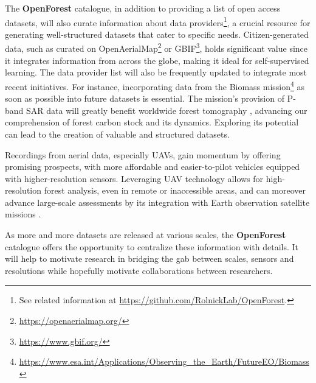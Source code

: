 \documentclass{CUP-JNL-DTM}%
\newcommand{\ELc}[1]{\textcolor{orange}{[\textbf{Eti}: #1]}}
\newcommand{\TKc}[1]{\textcolor{olive}{[\textbf{Tej}: #1]}}
\theoremstyle{definition}
\numberwithin{equation}{section}
\begin{document}
The \textbf{OpenForest} catalogue, in addition to providing a list of open access datasets, will also curate information about data providers\footnote{See related information at \url{https://github.com/RolnickLab/OpenForest}.}, a crucial resource for generating well-structured datasets that cater to specific needs. Citizen-generated data, such as curated on OpenAerialMap\footnote{\url{https://openaerialmap.org/}} or GBIF\footnote{\url{https://www.gbif.org/}}, holds significant value since it integrates information from across the globe, making it ideal for self-supervised learning. The data provider list will also be frequently updated to integrate most recent initiatives. For instance, incorporating data from the Biomass mission\footnote{\url{https://www.esa.int/Applications/Observing_the_Earth/FutureEO/Biomass}} as soon as possible into future datasets is essential. The mission's provision of P-band SAR data will greatly benefit worldwide forest tomography \cite{berenger_deep_2023}, advancing our comprehension of forest carbon stock and its dynamics.
Exploring its potential can lead to the creation of valuable and structured datasets.


Recordings from aerial data, especially UAVs, gain momentum by offering promising prospects, with more affordable and easier-to-pilot vehicles equipped with higher-resolution sensors. Leveraging UAV technology allows for high-resolution forest analysis, even in remote or inaccessible areas, and can moreover advance large-scale assessments by its integration with Earth observation satellite missions \citep{schiefer_uav-based_2023}.

As more and more datasets are released at various scales, the \textbf{OpenForest} catalogue offers the opportunity to centralize these information with details. It will help to motivate research in bridging the gab between scales, sensors and resolutions while hopefully motivate collaborations between researchers.





\end{document}

